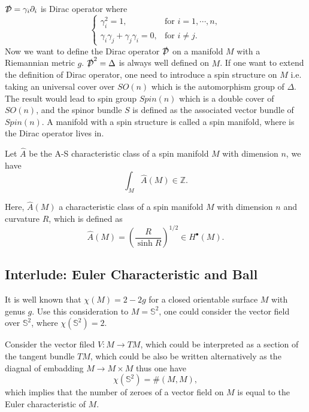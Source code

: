 \documentclass[10pt]{article}
\begin{document}
$ \slashed{\mathcal{D}} = \gamma_{i} \partial_{i}$ is Dirac operator where
\begin{equation*}
  \begin{cases}
    \gamma_{i}^{2} = 1, & \text{for } i = 1, \cdots , n,\\
    \gamma_{i} \gamma_{j} + \gamma_{j} \gamma_{i} = 0, & \text{for } i \neq j.
  \end{cases}
\end{equation*}
Now we want to define the Dirac operator $ \slashed{\mathcal{D}}$ on a manifold $ M$ with a Riemannian metric $ g$.
$\slashed{\mathcal{D}} ^{2} = \Delta$ is always well defined on $ M$.
If one want to extend the definition of Dirac operator, one need to introduce a spin structure on $ M$ i.e. taking an universal cover over $ SO(n) $ which is the automorphism group of $ \Delta$.
The result would lead to spin group $ Spin(n)$ which is a double cover of $ SO(n)$, and the spinor bundle $ S$ is defined as the associated vector bundle of $ Spin(n)$.
A manifold with a spin structure is called a spin manifold, where is the Dirac operator lives in.
\begin{theorem}
  Let $ \hat{A}$ be the A-S characteristic class of a spin manifold $ M$ with dimension $ n$, we have
  \begin{equation*}
    \int _{M} \hat{A}(M) \in \mathbb{Z}.
  \end{equation*}
\end{theorem}
Here, $ \hat{A}(M)$ a characteristic class of a spin manifold $ M$ with dimension $ n$ and curvature $ R$, which is defined as
\begin{equation*}
  \hat{A}(M) = \left( \frac{R}{\sinh R} \right)^{1 / 2} \in H^{\bullet}(M).
\end{equation*}

\subsection{Interlude: Euler Characteristic and Ball}

It is well known that $ \chi(M) = 2 - 2g$ for a closed orientable surface $ M$ with genus $ g$. Use this consideration to $ M = \mathbb{S}^{2}$, one could consider the vector field over $ \mathbb{S}^{2}$, where $ \chi(\mathbb{S}^{2}) = 2$.

Consider the vector filed $ V : M \rightarrow T M$, which could be interpreted as a section of the tangent bundle $ TM$, which could be also be written alternatively as the diagnal of embadding $ M \rightarrow M \times M$ thus one have
\begin{equation*}
  \chi(\mathbb{S}^{2}) = \# (M, M),
\end{equation*}
which implies that the number of zeroes of a vector field on $ M$ is equal to the Euler characteristic of $ M$.
\end{document}
